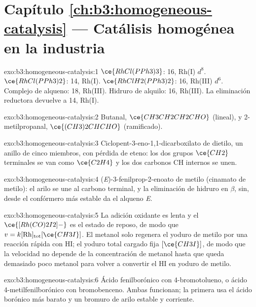 \section*{Capítulo \ref{ch:b3:homogeneous-catalysis} --- Catálisis homogénea en la industria}

\begin{solution}{exo:b3:homogeneous-catalysis:1}
$\ce{RhCl(PPh3)3}$: 16, Rh(I) $d^8$. $\ce{RhCl(PPh3)2}$: 14, Rh(I). $\ce{RhClH2(PPh3)2}$: 16, Rh(III) $d^6$.
Complejo de alqueno: 18, Rh(III). Hidruro de alquilo: 16, Rh(III). La eliminación reductora
devuelve a 14, Rh(I).
\end{solution}

\begin{solution}{exo:b3:homogeneous-catalysis:2}
Butanal, $\ce{CH3CH2CH2CHO}$ (lineal), y 2-metilpropanal, $\ce{(CH3)2CHCHO}$ (ramificado).
\end{solution}

\begin{solution}{exo:b3:homogeneous-catalysis:3}
Ciclopent-3-eno-1,1-dicarboxilato de dietilo, un anillo de cinco miembros, con pérdida de
eteno: los dos grupos $\ce{CH2}$ terminales se van como $\ce{C2H4}$ y los dos carbonos CH internos
se unen.
\end{solution}

\begin{solution}{exo:b3:homogeneous-catalysis:4}
(\textit{E})-3-fenilprop-2-enoato de metilo (cinamato de metilo): el arilo se une al
carbono terminal, y la eliminación de hidruro en $\beta$, sin, desde el confórmero más estable
da el alqueno \textit{E}.
\end{solution}

\begin{solution}{exo:b3:homogeneous-catalysis:5}
La adición oxidante es lenta y el $\ce{[Rh(CO)2I2]-}$ es el estado de reposo, de modo que
$v = k[\mathrm{Rh}]_{\mathrm{tot}}[\ce{CH3I}]$. El metanol solo regenera el yoduro de metilo por una reacción rápida con HI;
el yoduro total cargado fija $[\ce{CH3I}]$, de modo que la velocidad no depende de la concentración de
metanol hasta que queda demasiado poco metanol para volver a convertir el HI en
yoduro de metilo.
\end{solution}

\begin{solution}{exo:b3:homogeneous-catalysis:6}
Ácido fenilborónico con 4-bromotolueno, o ácido 4-metilfenilborónico con
bromobenceno. Ambas funcionan; la primera usa el ácido borónico más barato y un bromuro de arilo
estable y corriente.
\end{solution}

